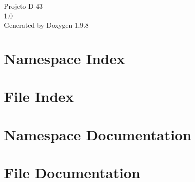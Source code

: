 \documentclass[twoside]{book}
\newcommand{\+}{\discretionary{\mbox{\scriptsize$\hookleftarrow$}}{}{}}
\newcommand{\clearemptydoublepage}{%
    \newpage{\pagestyle{empty}\cleardoublepage}%
  }
\begin{document}
  \raggedbottom
    \hypersetup{pageanchor=false,
                bookmarksnumbered=true,
                pdfencoding=unicode
               }
  \begin{titlepage}
  \vspace*{7cm}
  \begin{center}%
  {\Large Projeto D-\/43}\\
  [1ex]\large 1.\+0 \\
  \vspace*{1cm}
  {\large Generated by Doxygen 1.9.8}\\
  \end{center}
  \end{titlepage}
  \clearemptydoublepage
  \tableofcontents
  \clearemptydoublepage
  \hypersetup{pageanchor=true}


\chapter{Namespace Index}

\chapter{File Index}

\chapter{Namespace Documentation}

\chapter{File Documentation}



  \backmatter
  \newpage
  \clearemptydoublepage
  \printindex
\end{document}
